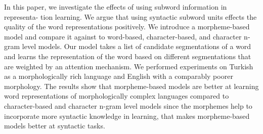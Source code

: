 In this paper, we investigate the effects of using subword information in representa- tion learning. We argue that using syntactic subword units effects the quality of the word representations positively. We introduce a morpheme-based model and compare it against to word-based, character-based, and character n-gram level models. Our model takes a list of candidate segmentations of a word and learns the representation of the word based on different segmentations that are weighted by an attention mechanism. We performed experiments on Turkish as a morphologically rich language and English with a comparably poorer morphology. The results show that morpheme-based models are better at learning word representations of morphologically complex languages compared to character-based and character n-gram level models since the morphemes help to incorporate more syntactic knowledge in learning, that makes morpheme-based models better at syntactic tasks.
